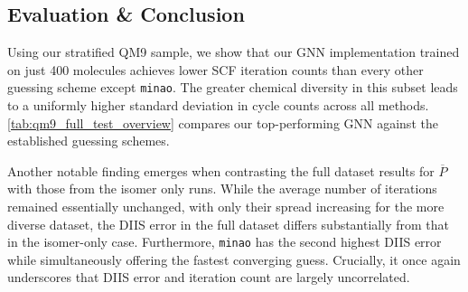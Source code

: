 \subsection{Evaluation \& Conclusion}
\label{sec:qm9_full_isomers_conclusion}
Using our stratified QM9 sample, we show that our GNN implementation trained on just 400 molecules achieves lower SCF iteration counts than every other guessing scheme except \texttt{minao}. The greater chemical diversity in this subset leads to a uniformly higher standard deviation in cycle counts across all methods. \autoref{tab:qm9_full_test_overview} compares our top-performing GNN against the established guessing schemes.

Another notable finding emerges when contrasting the full dataset results for $\overline{P}$ with those from the isomer only runs. While the average number of iterations remained essentially unchanged, with only their spread increasing for the more diverse dataset, the DIIS error in the full dataset differs substantially from that in the isomer-only case. Furthermore, \texttt{minao} has the second highest DIIS error while simultaneously offering the fastest converging guess. Crucially, it once again underscores that DIIS error and iteration count are largely uncorrelated. 
